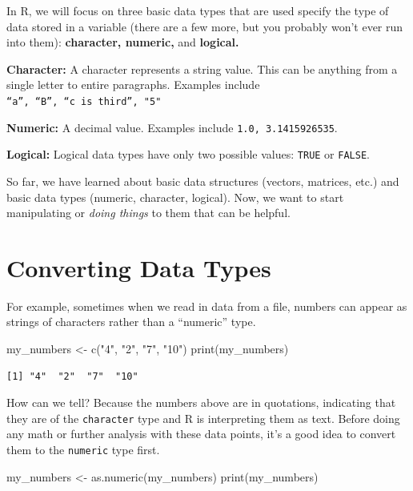 \documentclass[
  letterpaper,
  DIV=11,
  numbers=noendperiod]{scrreprt}
\newenvironment{Shaded}{\begin{snugshade}}{\end{snugshade}}
\newcommand{\FunctionTok}[1]{\textcolor[rgb]{0.28,0.35,0.67}{#1}}
\newcommand{\NormalTok}[1]{\textcolor[rgb]{0.00,0.23,0.31}{#1}}
\newcommand{\OtherTok}[1]{\textcolor[rgb]{0.00,0.23,0.31}{#1}}
\newcommand{\StringTok}[1]{\textcolor[rgb]{0.13,0.47,0.30}{#1}}
\begin{document}
In R, we will focus on three basic data types that are used specify the
type of data stored in a variable (there are a few more, but you
probably won't ever run into them): \textbf{character, numeric,} and
\textbf{logical.}

\textbf{Character:} A character represents a string value. This can be
anything from a single letter to entire paragraphs. Examples include
\texttt{“a”,\ “B”,\ “c\ is\ third”,\ "5"}

\textbf{Numeric:} A decimal value. Examples include
\texttt{1.0,\ 3.1415926535}.

\textbf{Logical:} Logical data types have only two possible values:
\texttt{TRUE} or \texttt{FALSE}.

So far, we have learned about basic data structures (vectors, matrices,
etc.) and basic data types (numeric, character, logical). Now, we want
to start manipulating or \emph{doing things} to them that can be
helpful.

\hypertarget{converting-data-types}{%
\section{Converting Data Types}\label{converting-data-types}}

For example, sometimes when we read in data from a file, numbers can
appear as strings of characters rather than a ``numeric'' type.

\begin{Shaded}
\begin{Highlighting}[]
\NormalTok{my\_numbers }\OtherTok{\textless{}{-}} \FunctionTok{c}\NormalTok{(}\StringTok{"4"}\NormalTok{, }\StringTok{"2"}\NormalTok{, }\StringTok{"7"}\NormalTok{, }\StringTok{"10"}\NormalTok{)}
\FunctionTok{print}\NormalTok{(my\_numbers)}
\end{Highlighting}
\end{Shaded}

\begin{verbatim}
[1] "4"  "2"  "7"  "10"
\end{verbatim}

How can we tell? Because the numbers above are in quotations, indicating
that they are of the \texttt{character} type and R is interpreting them
as text. Before doing any math or further analysis with these data
points, it's a good idea to convert them to the \texttt{numeric} type
first.

\begin{Shaded}
\begin{Highlighting}[]
\NormalTok{my\_numbers }\OtherTok{\textless{}{-}} \FunctionTok{as.numeric}\NormalTok{(my\_numbers)}
\FunctionTok{print}\NormalTok{(my\_numbers)}
\end{Highlighting}
\end{Shaded}
\end{document}
